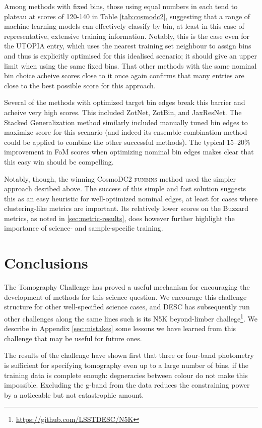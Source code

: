 \documentclass[twocolumn,twocolappendix]{aastex63}
\begin{document}
Among methods with fixed bins, those using equal numbers in each tend to plateau at scores of
120-140 in Table \ref{tab:cosmodc2}, suggesting that a range of machine learning models can
effectively classify by bin, at least in this case of representative, extensive training
information.  Notably, this is the case even for the \textsc{UTOPIA} entry, which uses the nearest 
training set neighbour to assign bins and thus is explicitly optimised
for this idealised scenario; it should give an upper limit when using the same fixed bins.
That other methods with the same nominal bin choice acheive scores close to it once again
confirms that many entries are close to the best possible score for this approach.


Several of the methods with optimized target bin edges break this
barrier and acheive very high scores.  This included ZotNet, ZotBin,  and JaxResNet.  The
Stacked Generalization method similarly included manually tuned bin edges to maximize
score for this scenario (and indeed its ensemble combination method could be applied to
combine the other successful methods). The typical 15--20\% improvement in FoM scores when optimizing
nominal bin edges makes clear that this easy win should be compelling.

Notably, though, the winning CosmoDC2 \textsc{funbins} method used the simpler approach desribed above. The 
success of this simple and fast solution suggests this as an easy heuristic for well-optimized nominal edges, 
at least for cases where clustering-like metrics are important.  Its relatively lower
scores on the Buzzard metrics, as noted in \autoref{sec:metric-results}, does however further highlight
the importance of science- and sample-specific training.

\section{Conclusions} \label{sec:conclusion}
The Tomography Challenge has proved a useful mechanism for encouraging the development
of methods for this science question.  We encourage this challenge structure for other
well-specified science cases, and DESC has subsequently run other challenges along the same lines
such is its N5K beyond-limber challege\footnote{\url{https://github.com/LSSTDESC/N5K}}.
We describe in Appendix \ref{sec:mistakes} some lessons we have learned from this challenge
that may be useful for future ones.

The results of the challenge have shown first that three or four-band photometry
is sufficient for specifying tomography even up to a large number of bins, if
the training data is complete enough: degneracies between colour do not make this impossible.
Excluding the g-band from the data reduces the constraining power by a noticeable but
not catastrophic amount.
\end{document}
